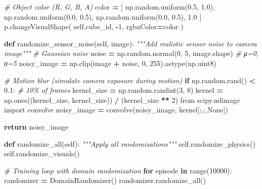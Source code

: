 \documentclass[
]{article}
\newenvironment{Shaded}{\begin{snugshade}}{\end{snugshade}}
\newcommand{\BuiltInTok}[1]{#1}
\newcommand{\CommentTok}[1]{\textcolor[rgb]{0.56,0.35,0.01}{\textit{#1}}}
\newcommand{\ControlFlowTok}[1]{\textcolor[rgb]{0.13,0.29,0.53}{\textbf{#1}}}
\newcommand{\DecValTok}[1]{\textcolor[rgb]{0.00,0.00,0.81}{#1}}
\newcommand{\FloatTok}[1]{\textcolor[rgb]{0.00,0.00,0.81}{#1}}
\newcommand{\ImportTok}[1]{#1}
\newcommand{\KeywordTok}[1]{\textcolor[rgb]{0.13,0.29,0.53}{\textbf{#1}}}
\newcommand{\NormalTok}[1]{#1}
\newcommand{\OperatorTok}[1]{\textcolor[rgb]{0.81,0.36,0.00}{\textbf{#1}}}
\newcommand{\VariableTok}[1]{\textcolor[rgb]{0.00,0.00,0.00}{#1}}
\begin{document}
\begin{Shaded}
\begin{Highlighting}[]
        \CommentTok{\# Object color (R, G, B, A)}
\NormalTok{        color }\OperatorTok{=}\NormalTok{ [}
\NormalTok{            np.random.uniform(}\FloatTok{0.5}\NormalTok{, }\FloatTok{1.0}\NormalTok{),}
\NormalTok{            np.random.uniform(}\FloatTok{0.0}\NormalTok{, }\FloatTok{0.5}\NormalTok{),}
\NormalTok{            np.random.uniform(}\FloatTok{0.0}\NormalTok{, }\FloatTok{0.5}\NormalTok{),}
            \FloatTok{1.0}
\NormalTok{        ]}
\NormalTok{        p.changeVisualShape(}
            \VariableTok{self}\NormalTok{.cube\_id,}
            \OperatorTok{{-}}\DecValTok{1}\NormalTok{,}
\NormalTok{            rgbaColor}\OperatorTok{=}\NormalTok{color}
\NormalTok{        )}

    \KeywordTok{def}\NormalTok{ randomize\_sensor\_noise(}\VariableTok{self}\NormalTok{, image):}
        \CommentTok{"""Add realistic sensor noise to camera image"""}
        \CommentTok{\# Gaussian noise}
\NormalTok{        noise }\OperatorTok{=}\NormalTok{ np.random.normal(}\DecValTok{0}\NormalTok{, }\DecValTok{5}\NormalTok{, image.shape)  }\CommentTok{\# μ=0, σ=5}
\NormalTok{        noisy\_image }\OperatorTok{=}\NormalTok{ np.clip(image }\OperatorTok{+}\NormalTok{ noise, }\DecValTok{0}\NormalTok{, }\DecValTok{255}\NormalTok{).astype(np.uint8)}

        \CommentTok{\# Motion blur (simulate camera exposure during motion)}
        \ControlFlowTok{if}\NormalTok{ np.random.rand() }\OperatorTok{\textless{}} \FloatTok{0.1}\NormalTok{:  }\CommentTok{\# 10\% of frames}
\NormalTok{            kernel\_size }\OperatorTok{=}\NormalTok{ np.random.randint(}\DecValTok{3}\NormalTok{, }\DecValTok{8}\NormalTok{)}
\NormalTok{            kernel }\OperatorTok{=}\NormalTok{ np.ones((kernel\_size, kernel\_size)) }\OperatorTok{/}\NormalTok{ (kernel\_size }\OperatorTok{**} \DecValTok{2}\NormalTok{)}
            \ImportTok{from}\NormalTok{ scipy.ndimage }\ImportTok{import}\NormalTok{ convolve}
\NormalTok{            noisy\_image }\OperatorTok{=}\NormalTok{ convolve(noisy\_image, kernel[:,:,}\VariableTok{None}\NormalTok{])}

        \ControlFlowTok{return}\NormalTok{ noisy\_image}

    \KeywordTok{def}\NormalTok{ randomize\_all(}\VariableTok{self}\NormalTok{):}
        \CommentTok{"""Apply all randomizations"""}
        \VariableTok{self}\NormalTok{.randomize\_physics()}
        \VariableTok{self}\NormalTok{.randomize\_visuals()}

\CommentTok{\# Training loop with domain randomization}
\ControlFlowTok{for}\NormalTok{ episode }\KeywordTok{in} \BuiltInTok{range}\NormalTok{(}\DecValTok{10000}\NormalTok{):}
\NormalTok{    randomizer }\OperatorTok{=}\NormalTok{ DomainRandomizer()}
\NormalTok{    randomizer.randomize\_all()}


\end{Highlighting}
\end{Shaded}
\end{document}
